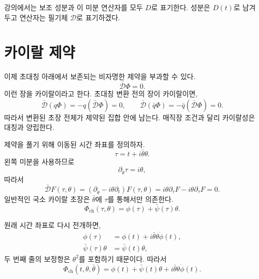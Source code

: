 강의에서는 보조 성분과 이 미분 연산자를 모두 \(D\)로 표기한다. 성분은 \(D(t)\)로 남겨 두고 연산자는 필기체 \(\mathcal D\)로 표기하겠다.

\section{카이랄 제약}

이제 초대칭 아래에서 보존되는 비자명한 제약을 부과할 수 있다.
\begin{equation}
\bar{\mathcal D}\Phi=0.
\label{eq:l7-chiral-constraint}
\end{equation}
이런 장을 카이랄이라고 한다. 초대칭 변환 전의 장이 카이랄이면,
\begin{equation}
\bar{\mathcal D}(q\Phi)
=-q(\bar{\mathcal D}\Phi)=0,
\qquad
\bar{\mathcal D}(\bar q\Phi)
=-\bar q(\bar{\mathcal D}\Phi)=0.
\end{equation}
따라서 변환된 초장 전체가 제약된 집합 안에 남는다. 매직장 조건과 달리 카이랄성은 대칭과 양립한다.

제약을 풀기 위해 이동된 시간 좌표를 정의하자.
\begin{equation}
\tau=t+i\bar\theta\theta.
\label{eq:l7-chiral-time}
\end{equation}
왼쪽 미분을 사용하므로
\begin{equation}
\partial_{\bar\theta}\tau=i\theta,
\end{equation}
따라서
\begin{equation}
\bar{\mathcal D}F(\tau,\theta)
=\left(\partial_{\bar\theta}-i\theta\partial_t\right)F(\tau,\theta)
=i\theta\partial_\tau F-i\theta\partial_\tau F=0.
\end{equation}
일반적인 국소 카이랄 초장은 \(\bar\theta\)에 \(\tau\)를 통해서만 의존한다.
\begin{equation}
\Phi_{\mathrm{ch}}(\tau,\theta)
=\phi(\tau)+\bar\psi(\tau)\theta.
\label{eq:l7-chiral-field-tau}
\end{equation}

\begin{classroomqa}
\end{classroomqa}

원래 시간 좌표로 다시 전개하면,
\begin{align}
\phi(\tau)
&=\phi(t)+i\bar\theta\theta\dot\phi(t),\\
\bar\psi(\tau)\theta
&=\bar\psi(t)\theta,
\end{align}
두 번째 줄의 보정항은 \(\theta^2\)를 포함하기 때문이다. 따라서
\begin{equation}
\Phi_{\mathrm{ch}}(t,\theta,\bar\theta)
=\phi(t)+\bar\psi(t)\theta
+i\bar\theta\theta\dot\phi(t).
\label{eq:l7-chiral-field-components}
\end{equation}

